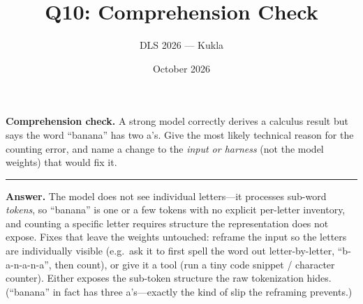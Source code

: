 \documentclass[11pt]{article}
\title{Q10: Comprehension Check}
\author{DLS 2026 --- Kukla}
\date{October 2026}
\begin{document}
\maketitle
\textbf{Comprehension check.} A strong model correctly derives a calculus result but says the word
``banana'' has two a's. Give the most likely technical reason for the counting error, and name a change to
the \emph{input or harness} (not the model weights) that would fix it.

\vspace{0.8cm}\hrule\vspace{4pt}
{\small\textbf{Answer.} The model does not see individual letters---it processes sub-word \emph{tokens}, so
``banana'' is one or a few tokens with no explicit per-letter inventory, and counting a specific letter
requires structure the representation does not expose. Fixes that leave the weights untouched: reframe the
input so the letters are individually visible (e.g.\ ask it to first spell the word out letter-by-letter,
``b-a-n-a-n-a'', then count), or give it a tool (run a tiny code snippet / character counter). Either
exposes the sub-token structure the raw tokenization hides. (``banana'' in fact has three a's---exactly
the kind of slip the reframing prevents.)}
\end{document}

